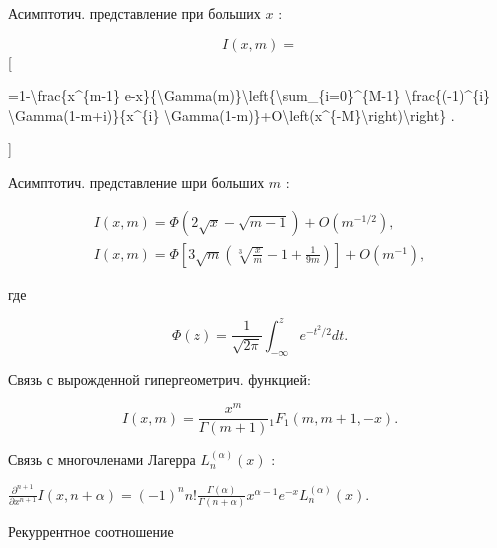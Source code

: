\documentclass[10pt]{article}
\begin{document}
Асимптотич. представление при больших $x$ :



\[

I(x, m)=

\][



=1-\textbackslash frac\{x\^{}\{m-1\} e-x\}\{\textbackslash Gamma(m)\}\textbackslash left\{\textbackslash sum\_\{i=0\}\^{}\{M-1\} \textbackslash frac\{(-1)\^{}\{i\} \textbackslash Gamma(1-m+i)\}\{x\^{}\{i\} \textbackslash Gamma(1-m)\}+O\textbackslash left(x\^{}\{-M\}\textbackslash right)\textbackslash right\} .

]



Асимптотич. представление шри больших $m$ :



\[

\begin{gathered}

I(x, m)=\Phi(2 \sqrt{x}-\sqrt{m-1})+O\left(m^{-1 / 2}\right), \\

I(x, m)=\Phi\left[3 \sqrt{m}\left(\sqrt[3]{\frac{x}{m}}-1+\frac{1}{9 m}\right)\right]+O\left(m^{-1}\right),

\end{gathered}

\]



где



\[

\Phi(z)=\frac{1}{\sqrt{2 \pi}} \int_{-\infty}^{z} e^{-t^{2} / 2} d t .

\]



Связь с вырожденной гипергеометрич. функцией:



\[

I(x, m)=\frac{x^{m}}{\Gamma(m+1)}{ }_{1} F_{1}(m, m+1,-x) .

\]



Связь с многочленами Лагерра $L_{n}^{(\alpha)}(x)$ :



$\frac{\partial^{n+1}}{\partial x^{n+1}} I(x, n+\alpha)=(-1)^{n} n ! \frac{\Gamma(\alpha)}{\Gamma(n+\alpha)} x^{\alpha-1} e^{-x} L_{n}^{(\alpha)}(x)$.



Рекуррентное соотношение
\end{document}
